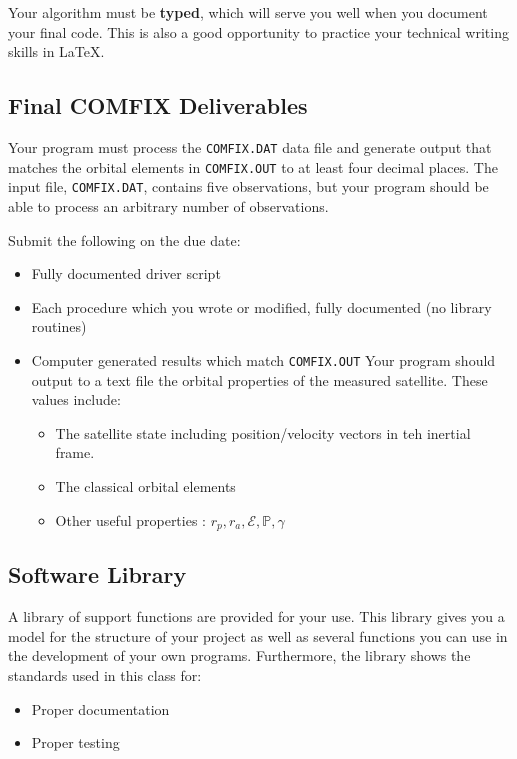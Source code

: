 \documentclass[11pt, reqno]{article}    %
\begin{document}
Your algorithm must be \textbf{typed}, which will serve you well when you document your final code. 
This is also a good opportunity to practice your technical writing skills in \LaTeX.

\subsection*{Final COMFIX Deliverables}

Your program must process the \texttt{COMFIX.DAT} data file and generate output that matches the orbital elements in \texttt{COMFIX.OUT} to at least four decimal places. 
The input file, \texttt{COMFIX.DAT}, contains five observations, but your program should be able to process an arbitrary number of observations.

Submit the following on the due date:
\begin{itemize}
    \item Fully documented driver script
    \item Each procedure which you wrote or modified, fully documented (no library routines)
    \item Computer generated results which match \texttt{COMFIX.OUT}
        Your program should output to a text file the orbital properties of the measured satellite. 
        These values include:
        \begin{itemize}
            \item The satellite state including position/velocity vectors in teh inertial frame.
            \item The classical orbital elements
            \item Other useful properties : \( r_p, r_a, \mathcal{E}, \mathbb{P}, \gamma\)
        \end{itemize}
\end{itemize}

\subsection*{Software Library}

A library of support functions are provided for your use. 
This library gives you a model for the structure of your project as well as several functions you can use in the development of your own programs.
Furthermore, the library shows the standards used in this class for:
\begin{itemize}
    \item Proper documentation
    \item Proper testing
\end{itemize}
\end{document}
